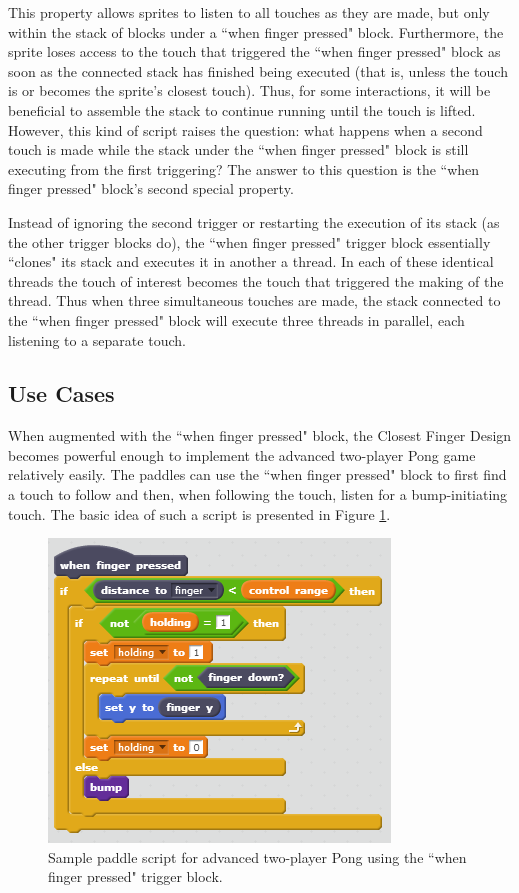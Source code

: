 This property allows sprites to listen to all touches as they are made, but only within the stack of blocks under a ``when finger pressed" block. Furthermore, the sprite loses access to the touch that triggered the ``when finger pressed" block as soon as the connected stack has finished being executed (that is, unless the touch is or becomes the sprite's closest touch). Thus, for some interactions, it will be beneficial to assemble the stack to continue running until the touch is lifted. However, this kind of script raises the question: what happens when a second touch is made while the stack under the ``when finger pressed" block is still executing from the first triggering? The answer to this question is the ``when finger pressed" block's second special property.

Instead of ignoring the second trigger or restarting the execution of its stack (as the other trigger blocks do), the ``when finger pressed" trigger block essentially ``clones" its stack and executes it in another a thread. In each of these identical threads the touch of interest becomes the touch that triggered the making of the thread. Thus when three simultaneous touches are made, the stack connected to the ``when finger pressed" block will execute three threads in parallel, each listening to a separate touch.
 
\subsection{Use Cases}

When augmented with the ``when finger pressed" block, the Closest Finger Design becomes powerful enough to implement the advanced two-player Pong game relatively easily. The paddles can use the ``when finger pressed" block to first find a touch to follow and then, when following the touch, listen for a bump-initiating touch. The basic idea of such a script is presented in Figure \ref{AdvancedTwoPlayerPongCFD}.

\begin{figure}
\centering
\includegraphics{images/AdvancedTwoPlayerPongCFD.PNG}
\caption[Sample Script for Advanced Two-Player Pong Using the Closest Finger Design Extension]{Sample paddle script for advanced two-player Pong using the ``when finger pressed" trigger block.}
\label{AdvancedTwoPlayerPongCFD}
\end{figure}

